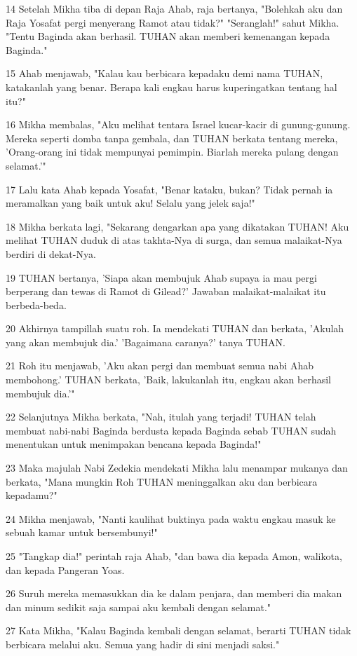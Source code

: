 \par 14 Setelah Mikha tiba di depan Raja Ahab, raja bertanya, "Bolehkah aku dan Raja Yosafat pergi menyerang Ramot atau tidak?" "Seranglah!" sahut Mikha. "Tentu Baginda akan berhasil. TUHAN akan memberi kemenangan kepada Baginda."
\par 15 Ahab menjawab, "Kalau kau berbicara kepadaku demi nama TUHAN, katakanlah yang benar. Berapa kali engkau harus kuperingatkan tentang hal itu?"
\par 16 Mikha membalas, "Aku melihat tentara Israel kucar-kacir di gunung-gunung. Mereka seperti domba tanpa gembala, dan TUHAN berkata tentang mereka, 'Orang-orang ini tidak mempunyai pemimpin. Biarlah mereka pulang dengan selamat.'"
\par 17 Lalu kata Ahab kepada Yosafat, "Benar kataku, bukan? Tidak pernah ia meramalkan yang baik untuk aku! Selalu yang jelek saja!"
\par 18 Mikha berkata lagi, "Sekarang dengarkan apa yang dikatakan TUHAN! Aku melihat TUHAN duduk di atas takhta-Nya di surga, dan semua malaikat-Nya berdiri di dekat-Nya.
\par 19 TUHAN bertanya, 'Siapa akan membujuk Ahab supaya ia mau pergi berperang dan tewas di Ramot di Gilead?' Jawaban malaikat-malaikat itu berbeda-beda.
\par 20 Akhirnya tampillah suatu roh. Ia mendekati TUHAN dan berkata, 'Akulah yang akan membujuk dia.' 'Bagaimana caranya?' tanya TUHAN.
\par 21 Roh itu menjawab, 'Aku akan pergi dan membuat semua nabi Ahab membohong.' TUHAN berkata, 'Baik, lakukanlah itu, engkau akan berhasil membujuk dia.'"
\par 22 Selanjutnya Mikha berkata, "Nah, itulah yang terjadi! TUHAN telah membuat nabi-nabi Baginda berdusta kepada Baginda sebab TUHAN sudah menentukan untuk menimpakan bencana kepada Baginda!"
\par 23 Maka majulah Nabi Zedekia mendekati Mikha lalu menampar mukanya dan berkata, "Mana mungkin Roh TUHAN meninggalkan aku dan berbicara kepadamu?"
\par 24 Mikha menjawab, "Nanti kaulihat buktinya pada waktu engkau masuk ke sebuah kamar untuk bersembunyi!"
\par 25 "Tangkap dia!" perintah raja Ahab, "dan bawa dia kepada Amon, walikota, dan kepada Pangeran Yoas.
\par 26 Suruh mereka memasukkan dia ke dalam penjara, dan memberi dia makan dan minum sedikit saja sampai aku kembali dengan selamat."
\par 27 Kata Mikha, "Kalau Baginda kembali dengan selamat, berarti TUHAN tidak berbicara melalui aku. Semua yang hadir di sini menjadi saksi."
